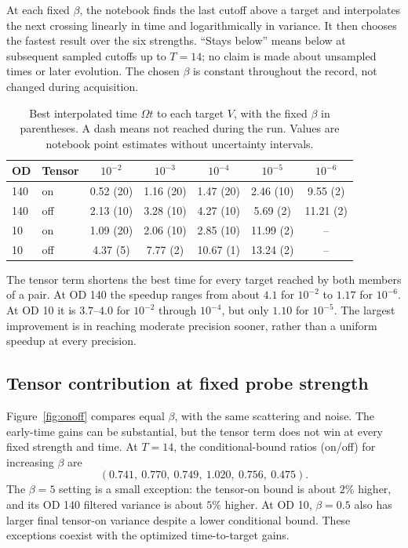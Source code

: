 \documentclass[11pt]{article}
\begin{document}
At each fixed $\beta$, the notebook finds the last cutoff above a target and
interpolates the next crossing linearly in time and logarithmically in variance.
It then chooses the fastest result over the six strengths. ``Stays below''
means below at subsequent sampled cutoffs up to $T=14$; no claim is made about
unsampled times or later evolution. The chosen $\beta$ is constant throughout
the record, not changed during acquisition.

\begin{table}[htbp]
\centering
\small
\setlength{\tabcolsep}{5pt}
\begin{tabular}{@{}llccccc@{}}
\toprule
OD & Tensor & $10^{-2}$ & $10^{-3}$ & $10^{-4}$ & $10^{-5}$ & $10^{-6}$ \\
\midrule
140 & on  & 0.52 (20) & 1.16 (20) & 1.47 (20) & 2.46 (10) & 9.55 (2) \\
140 & off & 2.13 (10) & 3.28 (10) & 4.27 (10) & 5.69 (2) & 11.21 (2) \\
10 & on   & 1.09 (20) & 2.06 (10) & 2.85 (10) & 11.99 (2) & -- \\
10 & off  & 4.37 (5) & 7.77 (2) & 10.67 (1) & 13.24 (2) & -- \\
\bottomrule
\end{tabular}
\caption{Best interpolated time $\Omega t$ to each target $V$, with the fixed
$\beta$ in parentheses. A dash means not reached during the run. Values are
notebook point estimates without uncertainty intervals.}
\label{tab:ttt}
\end{table}

The tensor term shortens the best time for every target reached by both members
of a pair. At OD 140 the speedup ranges from about $4.1$ for $10^{-2}$ to $1.17$
for $10^{-6}$. At OD 10 it is $3.7$--$4.0$ for $10^{-2}$ through $10^{-4}$,
but only $1.10$ for $10^{-5}$. The largest improvement is in reaching moderate
precision sooner, rather than a uniform speedup at every precision.

\subsection{Tensor contribution at fixed probe strength}

Figure~\ref{fig:onoff} compares equal $\beta$, with the same scattering and
noise. The early-time gains can be substantial, but the tensor term does not
win at every fixed strength and time. At $T=14$, the conditional-bound ratios
(on/off) for increasing $\beta$ are
\begin{equation}
 (0.741,\ 0.770,\ 0.749,\ 1.020,\ 0.756,\ 0.475).
\end{equation}
The $\beta=5$ setting is a small exception: the tensor-on bound is about $2\%$
higher, and its OD 140 filtered variance is about $5\%$ higher. At OD 10,
$\beta=0.5$ also has larger final tensor-on variance despite a lower conditional
bound. These exceptions coexist with the optimized time-to-target gains.
\end{document}
